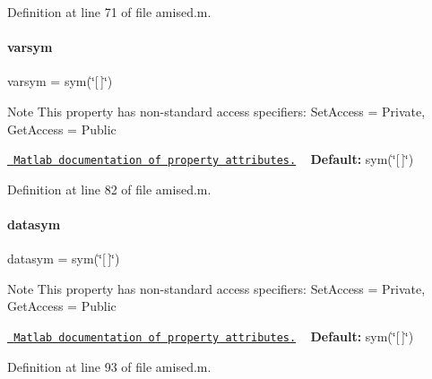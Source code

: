 Definition at line 71 of file amised.\+m.

\mbox{\label{classamised_ac797dd450a486506c269d236f884a292}} 
\paragraph{\texorpdfstring{varsym}{varsym}}
{\footnotesize\ttfamily varsym = sym(\char`\"{}\mbox{[}$\,$\mbox{]}\char`\"{})}

\begin{DoxyNote}{Note}
This property has non-\/standard access specifiers\+: {\ttfamily Set\+Access = Private, Get\+Access = Public} 

\href{http://www.mathworks.com/help/matlab/matlab_oop/property-attributes.html}{\texttt{ Matlab documentation of property attributes.}} ~\newline
{\bfseries{Default\+:}} sym(\char`\"{}\mbox{[}$\,$\mbox{]}\char`\"{}) 
\end{DoxyNote}


Definition at line 82 of file amised.\+m.

\mbox{\label{classamised_a38785e52a777bfe687f5418a2dcb44b7}} 
\paragraph{\texorpdfstring{datasym}{datasym}}
{\footnotesize\ttfamily datasym = sym(\char`\"{}\mbox{[}$\,$\mbox{]}\char`\"{})}

\begin{DoxyNote}{Note}
This property has non-\/standard access specifiers\+: {\ttfamily Set\+Access = Private, Get\+Access = Public} 

\href{http://www.mathworks.com/help/matlab/matlab_oop/property-attributes.html}{\texttt{ Matlab documentation of property attributes.}} ~\newline
{\bfseries{Default\+:}} sym(\char`\"{}\mbox{[}$\,$\mbox{]}\char`\"{}) 
\end{DoxyNote}


Definition at line 93 of file amised.\+m.

